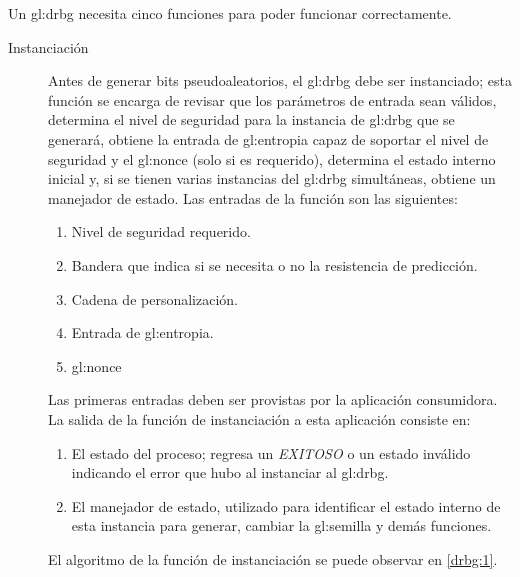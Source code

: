 %
%

Un \gls{gl:drbg} necesita cinco funciones para poder funcionar correctamente.
\begin{description}
  \item [Instanciación] Antes de generar bits pseudoaleatorios, el \gls{gl:drbg}
    debe ser instanciado; esta función se encarga de revisar que los parámetros
    de entrada sean válidos, determina  el nivel de seguridad para la instancia
    de \gls{gl:drbg} que se generará, obtiene la entrada de \gls{gl:entropia}
    capaz de soportar el nivel de seguridad y el \gls{gl:nonce} (solo si es
    requerido), determina el estado interno inicial y, si se tienen varias
    instancias del \gls{gl:drbg} simultáneas, obtiene un manejador de estado.
    Las entradas de la función son las siguientes:
    \begin{enumerate}
      \item Nivel de seguridad requerido.
      \item Bandera que indica si se necesita o no la resistencia de predicción.
      \item Cadena de personalización.
      \item Entrada de \gls{gl:entropia}.
      \item \gls{gl:nonce}
    \end{enumerate}
    Las primeras entradas deben ser provistas por la aplicación consumidora. La
    salida de la función de instanciación a esta aplicación consiste en:
    \begin{enumerate}
      \item El estado del proceso; regresa un \textit{EXITOSO} o un estado
        inválido indicando el error que hubo al instanciar al \gls{gl:drbg}.
      \item El manejador de estado, utilizado para identificar el estado interno
        de esta instancia para generar, cambiar la \gls{gl:semilla} y demás
        funciones.
    \end{enumerate}
    El algoritmo de la función de instanciación se puede observar en
    \ref{drbg:1}.


\end{description}
